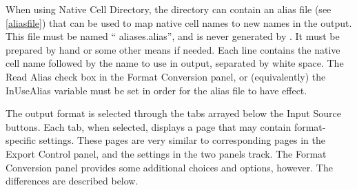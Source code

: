 When using {\cb Native Cell Directory}, the directory can contain an
alias file (see \ref{aliasfile}) that can be used to map native cell
names to new names in the output.  This file must be named ``{\vt
aliases.alias}'', and is never generated by {\Xic}.  It must be
prepared by hand or some other means if needed.  Each line contains
the native cell name followed by the name to use in output, separated
by white space.  The {\cb Read Alias} check box in the {\cb Format
Conversion} panel, or (equivalently) the {\cb InUseAlias} variable
must be set in order for the alias file to have effect.

The output format is selected through the tabs arrayed below the {\cb
Input Source} buttons.  Each tab, when selected, displays a page that
may contain format-specific settings.  These pages are very similar to
corresponding pages in the {\cb Export Control} panel, and the
settings in the two panels track.  The {\cb Format Conversion} panel
provides some additional choices and options, however.  The
differences are described below.

